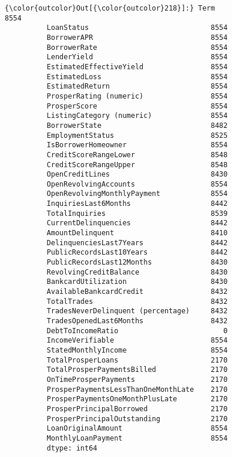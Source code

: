 \documentclass[11pt]{article}
\begin{document}
\begin{Verbatim}[commandchars=\\\{\}]
{\color{outcolor}Out[{\color{outcolor}218}]:} Term                                   8554
          LoanStatus                             8554
          BorrowerAPR                            8554
          BorrowerRate                           8554
          LenderYield                            8554
          EstimatedEffectiveYield                8554
          EstimatedLoss                          8554
          EstimatedReturn                        8554
          ProsperRating (numeric)                8554
          ProsperScore                           8554
          ListingCategory (numeric)              8554
          BorrowerState                          8482
          EmploymentStatus                       8525
          IsBorrowerHomeowner                    8554
          CreditScoreRangeLower                  8548
          CreditScoreRangeUpper                  8548
          OpenCreditLines                        8430
          OpenRevolvingAccounts                  8554
          OpenRevolvingMonthlyPayment            8554
          InquiriesLast6Months                   8442
          TotalInquiries                         8539
          CurrentDelinquencies                   8442
          AmountDelinquent                       8410
          DelinquenciesLast7Years                8442
          PublicRecordsLast10Years               8442
          PublicRecordsLast12Months              8430
          RevolvingCreditBalance                 8430
          BankcardUtilization                    8430
          AvailableBankcardCredit                8432
          TotalTrades                            8432
          TradesNeverDelinquent (percentage)     8432
          TradesOpenedLast6Months                8432
          DebtToIncomeRatio                         0
          IncomeVerifiable                       8554
          StatedMonthlyIncome                    8554
          TotalProsperLoans                      2170
          TotalProsperPaymentsBilled             2170
          OnTimeProsperPayments                  2170
          ProsperPaymentsLessThanOneMonthLate    2170
          ProsperPaymentsOneMonthPlusLate        2170
          ProsperPrincipalBorrowed               2170
          ProsperPrincipalOutstanding            2170
          LoanOriginalAmount                     8554
          MonthlyLoanPayment                     8554
          dtype: int64
\end{Verbatim}
            
\end{document}
